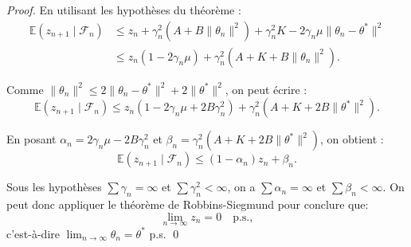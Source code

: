 \begin{proof}
    En utilisant les hypothèses du théorème :
    \[
    \begin{aligned}
        \mathbb{E}(z_{n+1} \mid \mathcal{F}_n) & \leqslant z_n + \gamma_n^2 (A + B \|\theta_n\|^2) + \gamma_n^2 K - 2\gamma_n \mu \|\theta_n - \theta^*\|^2 \\
        & \leqslant z_n (1 - 2\gamma_n \mu) + \gamma_n^2 (A + K + B \|\theta_n\|^2).
    \end{aligned}
    \]

    Comme $\|\theta_n\|^2 \leqslant 2\|\theta_n - \theta^*\|^2 + 2\|\theta^*\|^2$, on peut écrire :
    \[
        \mathbb{E}(z_{n+1} \mid \mathcal{F}_n) \leqslant z_n (1 - 2\gamma_n \mu + 2B\gamma_n^2) + \gamma_n^2 (A + K + 2B\|\theta^*\|^2).
    \]

    En posant $\alpha_n = 2\gamma_n \mu - 2B\gamma_n^2$ et $\beta_n = \gamma_n^2 (A + K + 2B\|\theta^*\|^2)$, on obtient :
    \[
        \mathbb{E}(z_{n+1} \mid \mathcal{F}_n) \leqslant (1 - \alpha_n) z_n + \beta_n.
    \]

    Sous les hypothèses $\sum \gamma_n = \infty$ et $\sum \gamma_n^2 < \infty$, on a $\sum \alpha_n = \infty$ et $\sum \beta_n < \infty$. On peut donc appliquer le théorème de Robbins-Siegmund pour conclure que:
    \[
        \lim_{n \to \infty} z_n = 0 \quad \text{p.s.},
    \]
    c'est-à-dire $\lim_{n \to \infty} \theta_n = \theta^*$ p.s.
    \qed
\end{proof}






